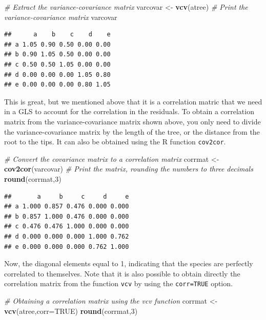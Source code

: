 \documentclass[
]{book}
\newenvironment{Shaded}{\begin{snugshade}}{\end{snugshade}}
\newcommand{\AttributeTok}[1]{\textcolor[rgb]{0.13,0.29,0.53}{#1}}
\newcommand{\CommentTok}[1]{\textcolor[rgb]{0.56,0.35,0.01}{\textit{#1}}}
\newcommand{\ConstantTok}[1]{\textcolor[rgb]{0.56,0.35,0.01}{#1}}
\newcommand{\DecValTok}[1]{\textcolor[rgb]{0.00,0.00,0.81}{#1}}
\newcommand{\FunctionTok}[1]{\textcolor[rgb]{0.13,0.29,0.53}{\textbf{#1}}}
\newcommand{\NormalTok}[1]{#1}
\newcommand{\OtherTok}[1]{\textcolor[rgb]{0.56,0.35,0.01}{#1}}
\begin{document}
\begin{Shaded}
\begin{Highlighting}[]
\CommentTok{\# Extract the variance{-}covariance matrix}
\NormalTok{varcovar }\OtherTok{\textless{}{-}} \FunctionTok{vcv}\NormalTok{(atree)}
\CommentTok{\# Print the variance{-}covariance matrix}
\NormalTok{varcovar}
\end{Highlighting}
\end{Shaded}

\begin{verbatim}
##      a    b    c    d    e
## a 1.05 0.90 0.50 0.00 0.00
## b 0.90 1.05 0.50 0.00 0.00
## c 0.50 0.50 1.05 0.00 0.00
## d 0.00 0.00 0.00 1.05 0.80
## e 0.00 0.00 0.00 0.80 1.05
\end{verbatim}

This is great, but we mentioned above that it is a correlation matric that we need in a GLS to account for the correlation in the residuals. To obtain a correlation matrix from the variance-covariance matrix shown above, you only need to divide the variance-covariance matrix by the length of the tree, or the distance from the root to the tips. It can also be obtained using the R function \texttt{cov2cor}.

\begin{Shaded}
\begin{Highlighting}[]
\CommentTok{\# Convert the covariance matrix to a correlation matrix}
\NormalTok{corrmat }\OtherTok{\textless{}{-}} \FunctionTok{cov2cor}\NormalTok{(varcovar)}
\CommentTok{\# Print the matrix, rounding the numbers to three decimals}
\FunctionTok{round}\NormalTok{(corrmat,}\DecValTok{3}\NormalTok{)}
\end{Highlighting}
\end{Shaded}

\begin{verbatim}
##       a     b     c     d     e
## a 1.000 0.857 0.476 0.000 0.000
## b 0.857 1.000 0.476 0.000 0.000
## c 0.476 0.476 1.000 0.000 0.000
## d 0.000 0.000 0.000 1.000 0.762
## e 0.000 0.000 0.000 0.762 1.000
\end{verbatim}

Now, the diagonal elements equal to 1, indicating that the species are perfectly correlated to themselves. Note that it is also possible to obtain directly the correlation matrix from the function \texttt{vcv} by using the \texttt{corr=TRUE} option.

\begin{Shaded}
\begin{Highlighting}[]
\CommentTok{\# Obtaining a correlation matrix using the \textquotesingle{}vcv\textquotesingle{} function}
\NormalTok{corrmat }\OtherTok{\textless{}{-}} \FunctionTok{vcv}\NormalTok{(atree,}\AttributeTok{corr=}\ConstantTok{TRUE}\NormalTok{)}
\FunctionTok{round}\NormalTok{(corrmat,}\DecValTok{3}\NormalTok{)}
\end{Highlighting}
\end{Shaded}
\end{document}
